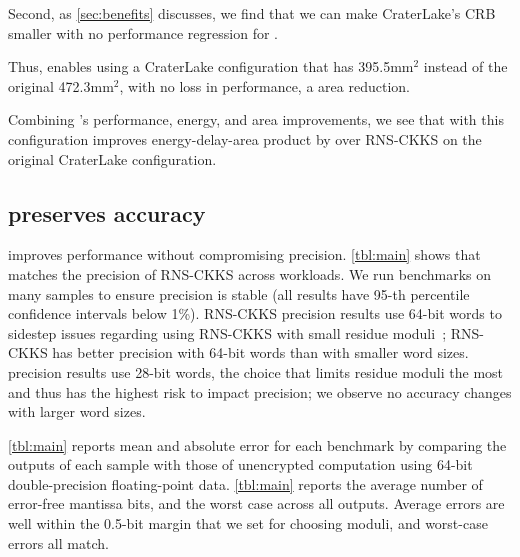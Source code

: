 Second, as \autoref{sec:benefits} discusses, we find that we can make CraterLake's
CRB  smaller with no performance regression for \name.

Thus, \name enables using a CraterLake configuration that has 395.5\;mm$^2$ instead of the original 472.3\;mm$^2$,
with no loss in performance, a  area reduction.

Combining \name's performance, energy, and area improvements, we see that \name
with this configuration improves energy-delay-area product by 
over RNS-CKKS on the original CraterLake configuration.

\subsection{\name preserves accuracy}

\name improves performance without compromising precision.
\autoref{tbl:main} shows that \name matches the precision of RNS-CKKS across
workloads.
We run benchmarks on many samples to ensure precision is stable
(all results have 95-th percentile confidence intervals below 1\%).
RNS-CKKS precision results use 64-bit words to sidestep issues regarding
using RNS-CKKS with small residue moduli~\cite{kim2022approximate};
RNS-CKKS has better precision with 64-bit words than with smaller word sizes.
\name precision results use 28-bit words, the choice that limits residue moduli
the most and thus has the highest risk to impact precision;
we observe no accuracy changes with larger word sizes.

\figRfSweep



\autoref{tbl:main} reports mean and absolute error for each benchmark by
comparing the outputs of each sample with those of unencrypted computation
using 64-bit double-precision floating-point data.
\autoref{tbl:main} reports the average number of error-free mantissa bits, and
the worst case across all outputs.
Average errors are well within the 0.5-bit margin that we set for choosing
moduli, and worst-case errors all match.

